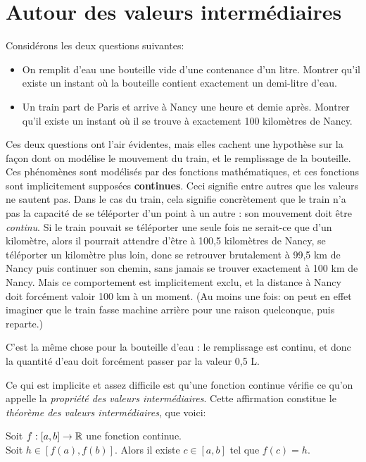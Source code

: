 
\chapter{Autour des valeurs intermédiaires}



Considérons les deux questions suivantes:
\begin{itemize}
\item On remplit d'eau une bouteille vide d'une contenance d'un litre. Montrer qu'il existe un instant où la bouteille contient exactement un demi-litre d'eau.
\item Un train part de Paris et arrive à Nancy une heure et demie après. Montrer qu'il existe un instant où il se trouve à exactement 100 kilomètres de Nancy.
\end{itemize}

Ces deux questions ont l'air évidentes, mais elles cachent une hypothèse sur la façon dont on modélise le mouvement du train, et le remplissage de la bouteille. Ces phénomènes sont modélisés par des fonctions mathématiques, et ces fonctions sont implicitement supposées \textbf{continues}. Ceci signifie entre autres que les valeurs ne \og sautent\fg{} pas. Dans le cas du train, cela signifie concrètement que le train n'a pas la capacité de se téléporter d'un point à un autre : son mouvement doit être \emph{continu}. Si le train pouvait se téléporter une seule fois ne serait-ce que d'un kilomètre, alors il pourrait attendre d'être à 100,5 kilomètres de Nancy, se téléporter un kilomètre plus loin, donc se retrouver brutalement à 99,5 km de Nancy puis continuer son chemin, sans jamais se trouver exactement à 100 km de Nancy. Mais ce comportement est implicitement exclu, et la distance à Nancy doit forcément valoir 100 km à un moment. (Au moins une fois: on peut en effet imaginer que le train fasse  machine arrière pour une raison quelconque, puis reparte.)

C'est la même chose pour la bouteille d'eau : le remplissage est continu, et donc la quantité d'eau doit forcément passer par la valeur 0,5 L.

Ce qui est implicite et assez difficile est qu'une fonction continue vérifie ce qu'on appelle la \emph{propriété des valeurs intermédiaires}. Cette affirmation constitue le \emph{théorème des valeurs intermédiaires}, que voici:

\begin{mdframed}[linewidth=2]
\begin{theoreme}
Soit $f : [a,b] \to \mathbb R$ une fonction continue.\\
Soit $h\in [f(a),f(b)]$. Alors il existe $c\in [a,b]$ tel que $f(c)=h$.
\end{theoreme}
\end{mdframed}

